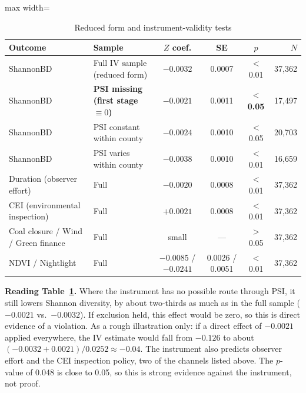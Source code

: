 \documentclass[11pt]{article}
\begin{document}
\begin{table}[H]\centering\small
\caption{Reduced form and instrument-validity tests}\label{tab:excl}
\begin{adjustbox}{max width=\linewidth}
\begin{tabular}{llcccr}
\toprule
Outcome & Sample & $Z$ coef. & SE & $p$ & $N$\\
\midrule
ShannonBD & Full IV sample (reduced form) & $-0.0032$ & 0.0007 & $<$0.01 & 37,362\\
ShannonBD & \textbf{PSI missing (first stage $\equiv0$)} & $\mathbf{-0.0021}$ & 0.0011 & \textbf{$<$0.05} & 17,497\\
ShannonBD & PSI constant within county & $-0.0024$ & 0.0010 & $<$0.05 & 20,703\\
ShannonBD & PSI varies within county & $-0.0038$ & 0.0010 & $<$0.01 & 16,659\\
\midrule
Duration (observer effort) & Full & $-0.0020$ & 0.0008 & $<$0.01 & 37,362\\
CEI (environmental inspection) & Full & $+0.0021$ & 0.0008 & $<$0.01 & 37,362\\
Coal closure / Wind / Green finance & Full & small & --- & $>$0.05 & 37,362\\
NDVI / Nightlight & Full & $-0.0085$ / $-0.0241$ & 0.0026 / 0.0051 & $<$0.01 & 37,362\\
\bottomrule
\end{tabular}
\end{adjustbox}
\end{table}

\begin{whybox}\small
\textbf{Reading Table~\ref{tab:excl}.} Where the instrument has no possible route through PSI, it still lowers Shannon diversity, by about two-thirds as much as in the full sample ($-0.0021$ vs.\ $-0.0032$). If exclusion held, this effect would be zero, so this is direct evidence of a violation. As a rough illustration only: if a direct effect of $-0.0021$ applied everywhere, the IV estimate would fall from $-0.126$ to about $(-0.0032+0.0021)/0.0252\approx-0.04$. The instrument also predicts observer effort and the CEI inspection policy, two of the channels listed above. The $p$-value of 0.048 is close to 0.05, so this is strong evidence against the instrument, not proof.
\end{whybox}
\end{document}
